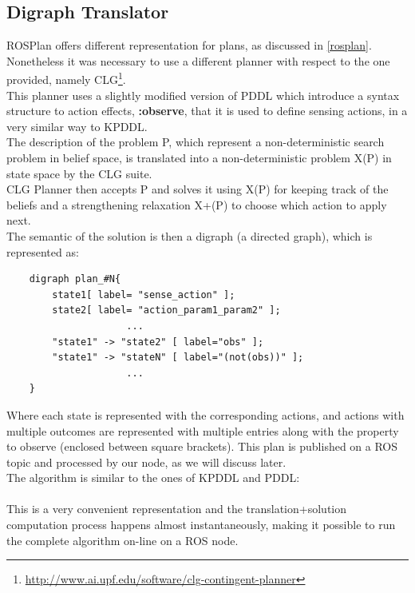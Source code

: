 \documentclass[pdftex,12pt,a4paper]{report}
\begin{document}
\subsection{Digraph Translator}
ROSPlan offers different representation for plans, as discussed in \ref{rosplan}. \\
Nonetheless it was necessary to use a different planner with respect to the one provided, namely CLG\cite{clg}\footnote{\url{http://www.ai.upf.edu/software/clg-contingent-planner}}. \\
This planner uses a slightly modified version of PDDL which introduce a syntax structure to action effects, \textbf{:observe}, that it is used to define sensing actions, in a very similar way to KPDDL.\\
The description of the problem P, which represent a non-deterministic search problem in belief space, is translated into a non-deterministic problem X(P) in state space by the CLG suite.\\
CLG Planner then accepts P and solves it using X(P) for keeping track of the beliefs and a strengthening relaxation X+(P) to choose which action to apply next.\\
The semantic of the solution is then a digraph (a directed graph), which is represented as:
\begin{verbatim}
    digraph plan_#N{
        state1[ label= "sense_action" ];
        state2[ label= "action_param1_param2" ];
                     ...
        "state1" -> "state2" [ label="obs" ];
        "state1" -> "stateN" [ label="(not(obs))" ];
                     ...
    }
\end{verbatim}
Where each state is represented with the corresponding actions, and actions with multiple outcomes are represented with multiple entries along with the property to observe (enclosed between square brackets).
This plan is published on a ROS topic and processed by our node, as we will discuss later.\\
The algorithm is similar to the ones of KPDDL and PDDL:\\
\\
\newline
This is a very convenient representation and the translation+solution computation process happens almost instantaneously, making it possible to run the complete algorithm on-line on a ROS node. 
\end{document}
